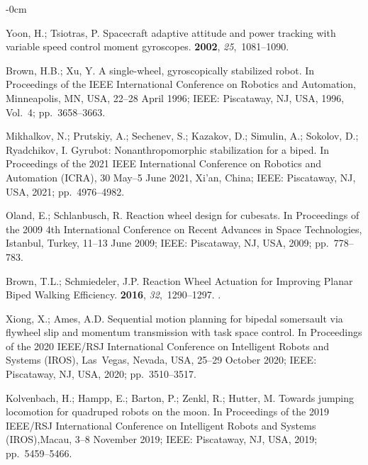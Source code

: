 \documentclass[sensors,article,accept,pdftex,moreauthors]{Definitions/mdpi}
\begin{document}
\begin{adjustwidth}{-\extralength}{0cm}
\begin{thebibliography}{999}
Yoon, H.; Tsiotras, P.
\newblock Spacecraft adaptive attitude and power tracking with variable speed
  control moment gyroscopes.
 {\bf 2002}, {\em
  25},~1081--1090.

Brown, H.B.; Xu, Y.
\newblock A single-wheel, gyroscopically stabilized robot.
\newblock In Proceedings of the  IEEE International Conference on
  Robotics and Automation, Minneapolis, MN, USA, 22--28 April 1996; IEEE: Piscataway, NJ, USA,  1996, Vol.~4; pp.~3658--3663.

Mikhalkov, N.; Prutskiy, A.; Sechenev, S.; Kazakov, D.; Simulin, A.; Sokolov,
  D.; Ryadchikov, I.
\newblock Gyrubot: Nonanthropomorphic stabilization for a biped.
\newblock In Proceedings of the 2021 IEEE International Conference on Robotics
  and Automation (ICRA), 30 May--5 June 2021, Xi'an, China; IEEE: Piscataway, NJ, USA,  2021; pp.~4976--4982.

Oland, E.; Schlanbusch, R.
\newblock Reaction wheel design for cubesats.
\newblock In Proceedings of the 2009 4th International Conference on Recent
  Advances in Space Technologies, Istanbul, Turkey, 11--13 June 2009; IEEE: Piscataway, NJ, USA,  2009; pp.~778--783.

Brown, T.L.; Schmiedeler, J.P.
\newblock Reaction Wheel Actuation for Improving Planar Biped Walking
  Efficiency.
 {\bf 2016}, {\em 32},~1290--1297.
.

Xiong, X.; Ames, A.D.
\newblock Sequential motion planning for bipedal somersault via flywheel slip
  and momentum transmission with task space control.
\newblock In Proceedings of the 2020 IEEE/RSJ International Conference on
  Intelligent Robots and Systems (IROS), Las~Vegas, Nevada, USA, 25--29 October 2020; IEEE: Piscataway, NJ, USA,  2020; pp.~3510--3517.

Kolvenbach, H.; Hampp, E.; Barton, P.; Zenkl, R.; Hutter, M.
\newblock Towards jumping locomotion for quadruped robots on the moon.
\newblock In Proceedings of the 2019 IEEE/RSJ International Conference on
  Intelligent Robots and Systems (IROS),Macau, 3--8 November 2019; IEEE: Piscataway, NJ, USA,  2019; pp.~5459--5466.


\end{thebibliography}
\end{adjustwidth}
\end{document}
